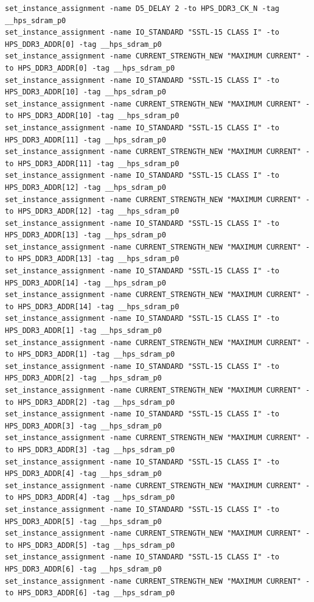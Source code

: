 \documentclass[conference]{IEEEtran}
\begin{document}
\begin{lstlisting}
set_instance_assignment -name D5_DELAY 2 -to HPS_DDR3_CK_N -tag __hps_sdram_p0
set_instance_assignment -name IO_STANDARD "SSTL-15 CLASS I" -to HPS_DDR3_ADDR[0] -tag __hps_sdram_p0
set_instance_assignment -name CURRENT_STRENGTH_NEW "MAXIMUM CURRENT" -to HPS_DDR3_ADDR[0] -tag __hps_sdram_p0
set_instance_assignment -name IO_STANDARD "SSTL-15 CLASS I" -to HPS_DDR3_ADDR[10] -tag __hps_sdram_p0
set_instance_assignment -name CURRENT_STRENGTH_NEW "MAXIMUM CURRENT" -to HPS_DDR3_ADDR[10] -tag __hps_sdram_p0
set_instance_assignment -name IO_STANDARD "SSTL-15 CLASS I" -to HPS_DDR3_ADDR[11] -tag __hps_sdram_p0
set_instance_assignment -name CURRENT_STRENGTH_NEW "MAXIMUM CURRENT" -to HPS_DDR3_ADDR[11] -tag __hps_sdram_p0
set_instance_assignment -name IO_STANDARD "SSTL-15 CLASS I" -to HPS_DDR3_ADDR[12] -tag __hps_sdram_p0
set_instance_assignment -name CURRENT_STRENGTH_NEW "MAXIMUM CURRENT" -to HPS_DDR3_ADDR[12] -tag __hps_sdram_p0
set_instance_assignment -name IO_STANDARD "SSTL-15 CLASS I" -to HPS_DDR3_ADDR[13] -tag __hps_sdram_p0
set_instance_assignment -name CURRENT_STRENGTH_NEW "MAXIMUM CURRENT" -to HPS_DDR3_ADDR[13] -tag __hps_sdram_p0
set_instance_assignment -name IO_STANDARD "SSTL-15 CLASS I" -to HPS_DDR3_ADDR[14] -tag __hps_sdram_p0
set_instance_assignment -name CURRENT_STRENGTH_NEW "MAXIMUM CURRENT" -to HPS_DDR3_ADDR[14] -tag __hps_sdram_p0
set_instance_assignment -name IO_STANDARD "SSTL-15 CLASS I" -to HPS_DDR3_ADDR[1] -tag __hps_sdram_p0
set_instance_assignment -name CURRENT_STRENGTH_NEW "MAXIMUM CURRENT" -to HPS_DDR3_ADDR[1] -tag __hps_sdram_p0
set_instance_assignment -name IO_STANDARD "SSTL-15 CLASS I" -to HPS_DDR3_ADDR[2] -tag __hps_sdram_p0
set_instance_assignment -name CURRENT_STRENGTH_NEW "MAXIMUM CURRENT" -to HPS_DDR3_ADDR[2] -tag __hps_sdram_p0
set_instance_assignment -name IO_STANDARD "SSTL-15 CLASS I" -to HPS_DDR3_ADDR[3] -tag __hps_sdram_p0
set_instance_assignment -name CURRENT_STRENGTH_NEW "MAXIMUM CURRENT" -to HPS_DDR3_ADDR[3] -tag __hps_sdram_p0
set_instance_assignment -name IO_STANDARD "SSTL-15 CLASS I" -to HPS_DDR3_ADDR[4] -tag __hps_sdram_p0
set_instance_assignment -name CURRENT_STRENGTH_NEW "MAXIMUM CURRENT" -to HPS_DDR3_ADDR[4] -tag __hps_sdram_p0
set_instance_assignment -name IO_STANDARD "SSTL-15 CLASS I" -to HPS_DDR3_ADDR[5] -tag __hps_sdram_p0
set_instance_assignment -name CURRENT_STRENGTH_NEW "MAXIMUM CURRENT" -to HPS_DDR3_ADDR[5] -tag __hps_sdram_p0
set_instance_assignment -name IO_STANDARD "SSTL-15 CLASS I" -to HPS_DDR3_ADDR[6] -tag __hps_sdram_p0
set_instance_assignment -name CURRENT_STRENGTH_NEW "MAXIMUM CURRENT" -to HPS_DDR3_ADDR[6] -tag __hps_sdram_p0

\end{lstlisting}
\end{document}
